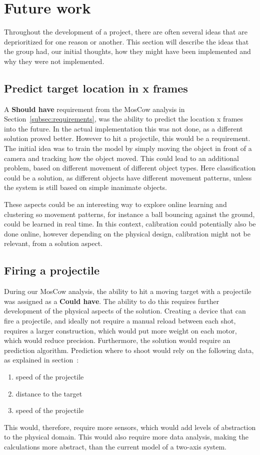 \section{Future work}\label{sec:futurework}
Throughout the development of a project, there are often several ideas that are deprioritized for one reason or another.
This section will describe the ideas that the group had, our initial thoughts, how they might have been implemented and why they were not implemented.


\subsection{Predict target location in x frames}
A \textbf{Should have} requirement from the MosCow analysis in Section~\ref{subsec:requirements}, was the ability to predict the location x frames into the future.
In the actual implementation this was not done, as a different solution proved better.
However to hit a projectile, this would be a requirement.
The initial idea was to train the model by simply moving the object in front of a camera and tracking how the object moved.
This could lead to an additional problem, based on different movement of different object types.
Here classification could be a solution, as different objects have different movement patterns, unless the system is still based on simple inanimate objects.

These aspects could be an interesting way to explore online learning and clustering so movement patterns, for instance a ball bouncing against the ground, could be learned in real time. 
In this context, calibration could potentially also be done online, however depending on the physical design, calibration might not be relevant, from a solution aspect.



\subsection{Firing a projectile}
During our MosCow analysis, the ability to hit a moving target with a projectile was assigned as a \textbf{Could have}.
The ability to do this requires further development of the physical aspects of the solution.
Creating a device that can fire a projectile, and ideally not require a manual reload between each shot, requires a larger construction, which would put more weight on each motor, which would reduce precision.
Furthermore, the solution would require an prediction algorithm.
Prediction where to shoot would rely on the following data, as explained in section~:
\begin{enumerate}
	\item speed of the projectile
	\item distance to the target
	\item speed of the projectile
\end{enumerate}
This would, therefore, require more sensors, which would add levels of abstraction to the physical domain.
This would also require more data analysis, making the calculations more abstract, than the current model of a two-axis system.


